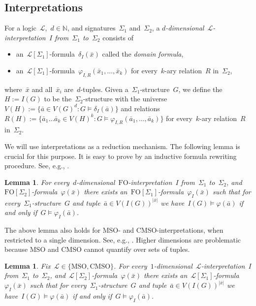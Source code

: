 \documentclass[11pt]{article}      \usepackage[margin=1in]{geometry}  \usepackage{microtype}
\newtheorem{lemma}[theorem]{Lemma}
\theoremstyle{definition}
\newcommand{\N}[0]{\mathrm{\mathbb{N}}}
\renewcommand{\phi}{\varphi}
\newcommand{\LL}{\mathcal{L}}
\newcommand{\FO}{\mathrm{FO}}
\newcommand{\MSO}{\mathrm{MSO}}
\newcommand{\CMSO}{\mathrm{CMSO}}
\begin{document}
\subsection{Interpretations}

    For a logic~$\LL$,~$d\in\N$, and signatures~$\Sigma_1$ and~$\Sigma_2$,
    a \emph{$d$-dimensional~$\LL$-interpretation~$I$ from~$\Sigma_1$ to~$\Sigma_2$} consists of 
    \begin{itemize}
        \item an~$\LL[\Sigma_1]$-formula~$\delta_I(\bar x)$ called the \emph{domain formula},
        \item an~$\LL[\Sigma_1]$-formula~$\phi_{I,R}(\bar x_1,\ldots,\bar x_k)$ for every~$k$-ary relation~$R$ in~$\Sigma_2$,
    \end{itemize}
    where~$\bar x$ and all~$\bar x_i$ are~$d$-tuples.
    Given a~$\Sigma_1$-structure~$G$, we define the~$H := I(G)$ to be the~$\Sigma_2$-structure with the universe~$V(H) := \{\bar a \in V(G)^d : G \models \delta_I(\bar a)\}$
    and relations~$R(H) := \{ \bar a_1 \ldots \bar a_k \in V(H)^k : G \models \phi_{I,R}(\bar a_1,\ldots,\bar a_k) \}$ for every~$k$-ary relation~$R$ in~$\Sigma_2$.


We will use interpretations as a reduction mechanism.
The following lemma is crucial for this purpose. It is easy to prove by an inductive formula rewriting procedure. 
See, e.g., \cite[Thm.\ 4.3.1]{hodges-shorter}.

\begin{lemma}\label{lem:interp-fo}
    For every~$d$-dimensional~$\FO$-interpretation~$I$ from~$\Sigma_1$ to~$\Sigma_2$, and~$\FO[\Sigma_2]$-formula~$\phi(\bar x)$ there exists an~$\FO[\Sigma_1]$-formula~$\phi_I(\bar x)$ such that for every~$\Sigma_1$-structure~$G$ and tuple~$\bar a \in V(I(G))^{|\bar x|}$ we have~$I(G) \models \phi(\bar a)$ if and only if~$G \models \phi_I(\bar a)$.
\end{lemma}

The above lemma also holds for MSO- and CMSO-interpretations, when restricted to a single dimension.
See, e.g., \cite[Thm.\ 7.10]{courcelle2012graph}.
Higher dimensions are problematic because MSO and CMSO cannot quantify over sets of tuples. 

\begin{lemma}\label{lem:interp-mso}
  Fix~$\LL\in\{\MSO,\CMSO\}$.
  For every~$1$-dimensional~$\LL$-interpretation~$I$ from~$\Sigma_1$ to~$\Sigma_2$, and~$\LL[\Sigma_2]$-formula~$\phi(\bar x)$ there exists an~$\LL[\Sigma_1]$-formula~$\phi_I(\bar x)$ such that for every~$\Sigma_1$-structure~$G$ and tuple~$\bar a \in V(I(G))^{|\bar x|}$ we have~$I(G) \models \phi(\bar a)$ if and only if~$G \models \phi_I(\bar a)$.
\end{lemma}
\end{document}
